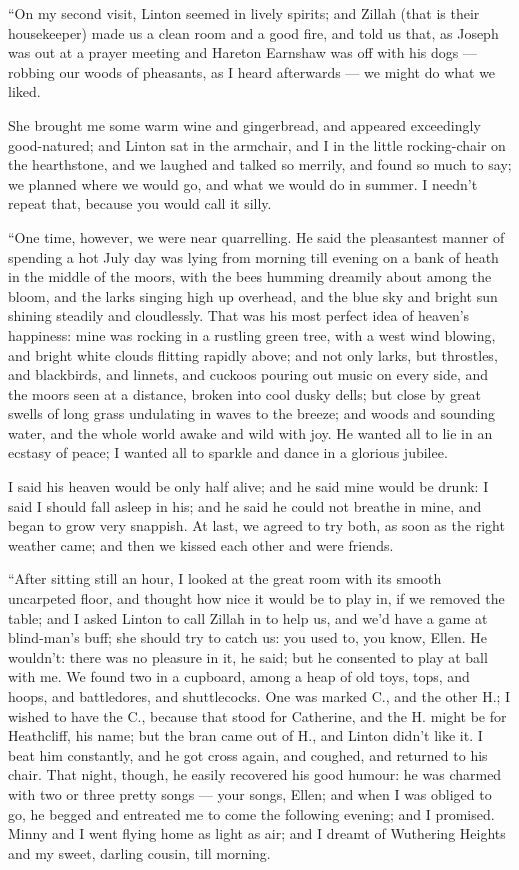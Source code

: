 \par “On my second visit, Linton seemed in lively spirits; and Zillah (that is their housekeeper) made us a clean room and a good fire, and told us that, as Joseph was out at a prayer meeting and Hareton Earnshaw was off with his dogs — robbing our woods of pheasants, as I heard afterwards — we might do what we liked.
\par She brought me some warm wine and gingerbread, and appeared exceedingly good-natured; and Linton sat in the armchair, and I in the little rocking-chair on the hearthstone, and we laughed and talked so merrily, and found so much to say; we planned where we would go, and what we would do in summer. I needn't repeat that, because you would call it silly.
\par “One time, however, we were near quarrelling. He said the pleasantest manner of spending a hot July day was lying from morning till evening on a bank of heath in the middle of the moors, with the bees humming dreamily about among the bloom, and the larks singing high up overhead, and the blue sky and bright sun shining steadily and cloudlessly. That was his most perfect idea of heaven's happiness: mine was rocking in a rustling green tree, with a west wind blowing, and bright white clouds flitting rapidly above; and not only larks, but throstles, and blackbirds, and linnets, and cuckoos pouring out music on every side, and the moors seen at a distance, broken into cool dusky dells; but close by great swells of long grass undulating in waves to the breeze; and woods and sounding water, and the whole world awake and wild with joy. He wanted all to lie in an ecstasy of peace; I wanted all to sparkle and dance in a glorious jubilee.
\par I said his heaven would be only half alive; and he said mine would be drunk: I said I should fall asleep in his; and he said he could not breathe in mine, and began to grow very snappish. At last, we agreed to try both, as soon as the right weather came; and then we kissed each other and were friends.
\par “After sitting still an hour, I looked at the great room with its smooth uncarpeted floor, and thought how nice it would be to play in, if we removed the table; and I asked Linton to call Zillah in to help us, and we'd have a game at blind-man's buff; she should try to catch us: you used to, you know, Ellen. He wouldn't: there was no pleasure in it, he said; but he consented to play at ball with me. We found two in a cupboard, among a heap of old toys, tops, and hoops, and battledores, and shuttlecocks. One was marked C., and the other H.; I wished to have the C., because that stood for Catherine, and the H. might be for Heathcliff, his name; but the bran came out of H., and Linton didn't like it. I beat him constantly, and he got cross again, and coughed, and returned to his chair. That night, though, he easily recovered his good humour: he was charmed with two or three pretty songs — your songs, Ellen; and when I was obliged to go, he begged and entreated me to come the following evening; and I promised. Minny and I went flying home as light as air; and I dreamt of Wuthering Heights and my sweet, darling cousin, till morning.

